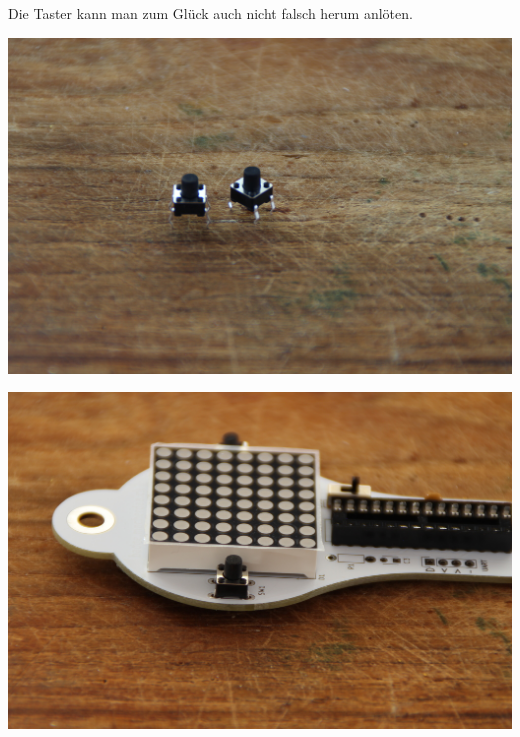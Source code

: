 \documentclass{article}
\begin{document}
Die Taster kann man zum Glück auch nicht falsch herum anlöten.

\vspace{1cm}

\begin{minipage}[b]{0.5\textwidth}
	\includegraphics[width=\textwidth]{Bilder2023/IMG_8378.JPG}
\end{minipage}
\begin{minipage}[b]{0.5\textwidth}
	\includegraphics[width=\textwidth]{Bilder2023/IMG_8379.JPG}
\end{minipage}

\vspace{0.5cm}
\end{document}
